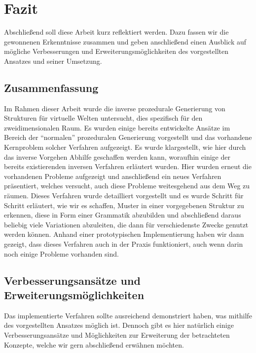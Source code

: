 %
\chapter{Fazit} %
Abschließend soll diese Arbeit kurz reflektiert werden. Dazu fassen wir die gewonnenen Erkenntnisse zusammen und geben
anschließend einen Ausblick auf mögliche Verbesserungen und Erweiterungsmöglichkeiten des vorgestellten Ansatzes und
seiner Umsetzung.

\section{Zusammenfassung}
Im Rahmen dieser Arbeit wurde die inverse prozedurale Generierung von Strukturen für virtuelle Welten untersucht, dies spezifisch
für den zweidimensionalen Raum. Es wurden einige bereits entwickelte Ansätze im Bereich der ``normalen'' prozeduralen Generierung
vorgestellt und das vorhandene Kernproblem solcher Verfahren aufgezeigt. Es wurde klargestellt, wie hier durch das inverse Vorgehen
Abhilfe geschaffen werden kann, woraufhin einige der bereits existierenden inversen Verfahren erläutert wurden. Hier wurden
erneut die vorhandenen Probleme aufgezeigt und anschließend ein neues Verfahren präsentiert, welches versucht, auch diese Probleme
weitesgehend aus dem Weg zu räumen. Dieses Verfahren wurde detailliert vorgestellt und es wurde Schritt für Schritt erläutert,
wie wir es schaffen, Muster in einer vorgegebenen Struktur zu erkennen, diese in Form einer Grammatik abzubilden und abschließend
daraus beliebig viele Variationen abzuleiten, die dann für verschiedenste Zwecke genutzt werden können. Anhand einer prototypischen
Implementierung haben wir dann gezeigt, dass dieses Verfahren auch in der Praxis funktioniert, auch wenn darin noch einige Probleme
vorhanden sind.

\section{Verbesserungsansätze und Erweiterungsmöglichkeiten}
Das implementierte Verfahren sollte ausreichend demonstriert haben, was mithilfe des vorgestellten Ansatzes möglich ist. Dennoch gibt
es hier natürlich einige Verbesserungsansätze und Möglichkeiten zur Erweiterung der betrachteten Konzepte, welche wir gern abschließend
erwähnen möchten.

